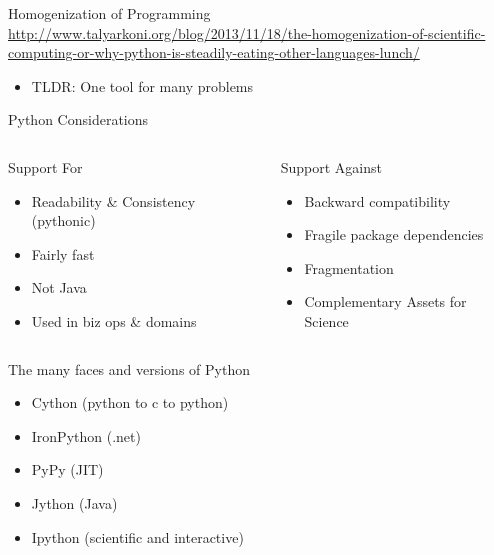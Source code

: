 \documentclass[presentation]{beamer}
\begin{document}
\begin{frame}[label=sec-2-0-4]{Homogenization of Programming}
\url{http://www.talyarkoni.org/blog/2013/11/18/the-homogenization-of-scientific-computing-or-why-python-is-steadily-eating-other-languages-lunch/} 

\begin{itemize}
\item TLDR: One tool for many problems
\end{itemize}
\end{frame}

\begin{frame}[label=sec-2-0-5]{Python Considerations}
\begin{columns}
\begin{column}{0.4\textwidth}
\begin{block}{Support For}
\begin{itemize}
\item Readability \& Consistency (pythonic)
\item Fairly fast
\item Not Java
\item Used in biz ops \& domains
\end{itemize}
\end{block}
\end{column}

\begin{column}{0.4\textwidth}
\begin{block}{Support Against}
\begin{itemize}
\item Backward compatibility
\item Fragile package dependencies
\item Fragmentation
\item Complementary Assets for Science
\end{itemize}
\end{block}
\end{column}
\end{columns}
\end{frame}

\begin{frame}[label=sec-2-0-6]{The many faces and versions of Python}
\begin{itemize}
\item Cython (python to c to python)
\item IronPython (.net)
\item PyPy (JIT)
\item Jython (Java)
\item Ipython (scientific and interactive)
\end{itemize}
\end{frame}
\end{document}
